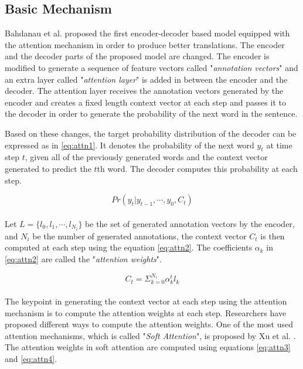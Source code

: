 \documentclass[preprint, 10pt]{elsarticle}
\begin{document}
		\subsection{Basic Mechanism}
		Bahdanau et al. \cite{bahdanau2014neural} proposed the first encoder-decoder based model equipped with the attention mechanism in order to produce better translations. The encoder and the decoder parts of the proposed model are changed. The encoder is modified to generate a sequence of feature vectors called "\textit{annotation vectors}" and an extra layer called "\textit{attention layer}" is added in between the encoder and the decoder. The attention layer receives the annotation vectors generated by the encoder and creates a fixed length context vector at each step and passes it to the decoder in order to generate the probability of the next word in the sentence.
		
		Based on these changes, the target probability distribution of the decoder can be expressed as in \eqref{eq:attn1}. It denotes the probability of the next word $y_t$ at time step $t$, given all of the previously generated words and the context vector generated to predict the $t$th word. The decoder computes this probability at each step.
		
		\begin{equation}
			Pr(y_t | y_{t-1}, \cdots, y_0 , C_t)
			\label{eq:attn1}
		\end{equation}
		\\
		Let $L = \{l_0, l_1, \cdots, l_{N_i}\}$ be the set of generated annotation vectors by the encoder, and $N_i$ be the number of generated annotations, the context vector $C_t$ is then computed at each step using the equation \eqref{eq:attn2}. The coefficients $\alpha_k$ in \eqref{eq:attn2} are called the "\textit{attention weights}".
		
		\begin{equation}
			C_t = \Sigma_{k=0}^{N_i} \alpha_k^t l_k
			\label{eq:attn2}
		\end{equation}
		\\
		The keypoint in generating the context vector at each step using the attention mechanism is to compute the attention weights at each step. Researchers have proposed different ways to compute the attention weights. One of the most used attention mechanisms, which is called "\textit{Soft Attention}", is proposed by Xu et al. \cite{xu2015show}. The attention weights in soft attention are computed using equations \eqref{eq:attn3} and \eqref{eq:attn4}.
		
\end{document}

